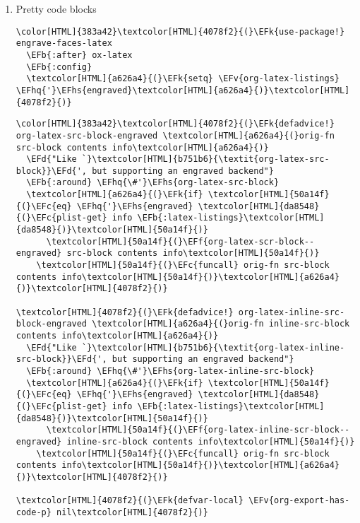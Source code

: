 \documentclass{scrartcl}
\newcommand{\EFk}[1]{\textcolor{EFk}{#1}} %
\newcommand{\EFd}[1]{\textcolor{EFd}{\textit{#1}}} %
\newcommand{\EFb}[1]{\textcolor{EFb}{#1}} %
\newcommand{\EFc}[1]{\textcolor{EFc}{#1}} %
\newcommand{\EFv}[1]{\textcolor{EFv}{#1}} %
\newcommand{\EFf}[1]{\textcolor{EFf}{#1}} %
\newcommand{\EFhq}[1]{\textcolor{EFhq}{#1}} %
\newcommand{\EFhs}[1]{\textcolor{EFhs}{#1}} %
\begin{document}
\begin{enumerate}
\item Pretty code blocks
\label{sec:org1953d9e}
\begin{Code}
\begin{Verbatim}[]
\color[HTML]{383a42}\textcolor[HTML]{4078f2}{(}\EFk{use-package!} engrave-faces-latex
  \EFb{:after} ox-latex
  \EFb{:config}
  \textcolor[HTML]{a626a4}{(}\EFk{setq} \EFv{org-latex-listings} \EFhq{'}\EFhs{engraved}\textcolor[HTML]{a626a4}{)}\textcolor[HTML]{4078f2}{)}
\end{Verbatim}
\end{Code}

\begin{Code}
\begin{Verbatim}[]
\color[HTML]{383a42}\textcolor[HTML]{4078f2}{(}\EFk{defadvice!} org-latex-src-block-engraved \textcolor[HTML]{a626a4}{(}orig-fn src-block contents info\textcolor[HTML]{a626a4}{)}
  \EFd{"Like `}\textcolor[HTML]{b751b6}{\textit{org-latex-src-block}}\EFd{', but supporting an engraved backend"}
  \EFb{:around} \EFhq{\#'}\EFhs{org-latex-src-block}
  \textcolor[HTML]{a626a4}{(}\EFk{if} \textcolor[HTML]{50a14f}{(}\EFc{eq} \EFhq{'}\EFhs{engraved} \textcolor[HTML]{da8548}{(}\EFc{plist-get} info \EFb{:latex-listings}\textcolor[HTML]{da8548}{)}\textcolor[HTML]{50a14f}{)}
      \textcolor[HTML]{50a14f}{(}\EFf{org-latex-scr-block--engraved} src-block contents info\textcolor[HTML]{50a14f}{)}
    \textcolor[HTML]{50a14f}{(}\EFc{funcall} orig-fn src-block contents info\textcolor[HTML]{50a14f}{)}\textcolor[HTML]{a626a4}{)}\textcolor[HTML]{4078f2}{)}

\textcolor[HTML]{4078f2}{(}\EFk{defadvice!} org-latex-inline-src-block-engraved \textcolor[HTML]{a626a4}{(}orig-fn inline-src-block contents info\textcolor[HTML]{a626a4}{)}
  \EFd{"Like `}\textcolor[HTML]{b751b6}{\textit{org-latex-inline-src-block}}\EFd{', but supporting an engraved backend"}
  \EFb{:around} \EFhq{\#'}\EFhs{org-latex-inline-src-block}
  \textcolor[HTML]{a626a4}{(}\EFk{if} \textcolor[HTML]{50a14f}{(}\EFc{eq} \EFhq{'}\EFhs{engraved} \textcolor[HTML]{da8548}{(}\EFc{plist-get} info \EFb{:latex-listings}\textcolor[HTML]{da8548}{)}\textcolor[HTML]{50a14f}{)}
      \textcolor[HTML]{50a14f}{(}\EFf{org-latex-inline-scr-block--engraved} inline-src-block contents info\textcolor[HTML]{50a14f}{)}
    \textcolor[HTML]{50a14f}{(}\EFc{funcall} orig-fn src-block contents info\textcolor[HTML]{50a14f}{)}\textcolor[HTML]{a626a4}{)}\textcolor[HTML]{4078f2}{)}

\textcolor[HTML]{4078f2}{(}\EFk{defvar-local} \EFv{org-export-has-code-p} nil\textcolor[HTML]{4078f2}{)}


\end{Verbatim}
\end{Code}
\end{enumerate}
\end{document}
